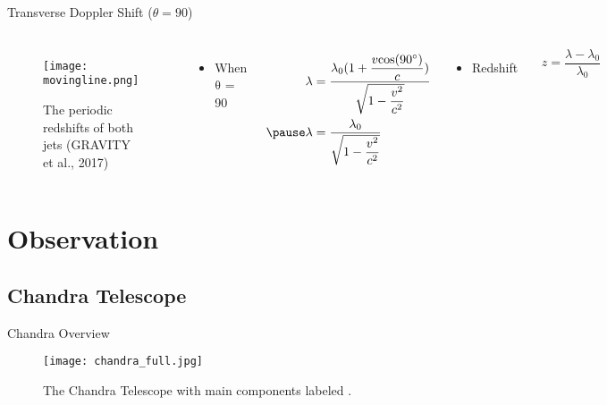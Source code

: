 \documentclass{beamer}
\begin{document}
\begin{frame}{Transverse Doppler Shift ($\theta = 90$\textdegree)}
       \begin{columns}
            \begin{figure}
                \centering
                \texttt{[image: movingline.png]}
                \caption{The periodic redshifts of both jets (GRAVITY et al., 2017)}
                \label{emission_lines}
           \end{figure}
           
          \begin{itemize}
              \item When $\mathrm{\theta}$ = 90\textdegree
          \end{itemize}
          \begin{align*}
              \lambda &= \dfrac{\lambda_0(1+\dfrac{v\mathrm{cos}(90\degree)}{c})}{\sqrt{1-\dfrac{v^2}{c^2}}}\\
              \pause
              \lambda &= \dfrac{\lambda_0}{\sqrt{1-\dfrac{v^2}{c^2}}}
          \end{align*}
          \pause
          \begin{itemize}
              \item Redshift
          \end{itemize}
          \begin{align*}
              z = \dfrac{\lambda- \lambda_{0}}{\lambda_{0}}
          \end{align*}
          \end{columns} 
\end{frame}










\section{Observation}
\subsection{Chandra Telescope}
\begin{frame}{Chandra Overview}
\begin{figure}
    \centering
    \texttt{[image: chandra\_full.jpg]}
    \caption{The Chandra Telescope with main components labeled \citep{Harbaugh2017}.}
    \label{chandra}
\end{figure}

    
\end{frame}
\end{document}
